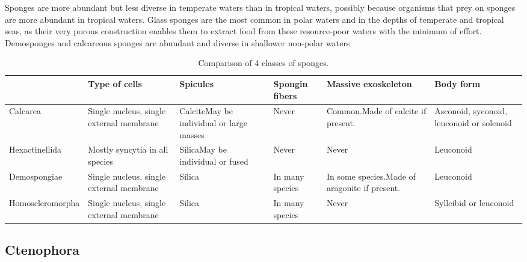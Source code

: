 Sponges are more abundant but less diverse in temperate waters than in tropical waters, possibly because organisms that prey on sponges are more abundant in tropical waters. Glass sponges are the most common in polar waters and in the depths of temperate and tropical seas, as their very porous construction enables them to extract food from these resource-poor waters with the minimum of effort. Demosponges and calcareous sponges are abundant and diverse in shallower non-polar waters

\onecolumn

\begin{table}

\caption{\label{tab:porifera}Comparison of 4 classes of sponges.}
\centering
\begin{tabular}[t]{>{\raggedright\arraybackslash}p{10em}>{\raggedright\arraybackslash}p{10em}>{\raggedright\arraybackslash}p{10em}>{\raggedright\arraybackslash}p{10em}>{\raggedright\arraybackslash}p{15em}>{\raggedright\arraybackslash}p{10em}}
\toprule
 & Type of cells & Spicules & Spongin fibers & Massive exoskeleton & Body form\\
\midrule
\rowcolor{gray!6}  Calcarea & Single nucleus, single external membrane & CalciteMay be individual or large masses & Never & Common.Made of calcite if present. & Asconoid, syconoid, leuconoid or solenoid\\
Hexactinellida & Mostly syncytia in all species & SilicaMay be individual or fused & Never & Never & Leuconoid\\
\rowcolor{gray!6}  Demospongiae & Single nucleus, single external membrane & Silica & In many species & In some species.Made of aragonite if present. & Leuconoid\\
Homoscleromorpha & Single nucleus, single external membrane & Silica & In many species & Never & Sylleibid or leuconoid\\
\bottomrule
\end{tabular}
\end{table}

\twocolumn

\hypertarget{ctenophora}{%
\subsection{Ctenophora}\label{ctenophora}}

